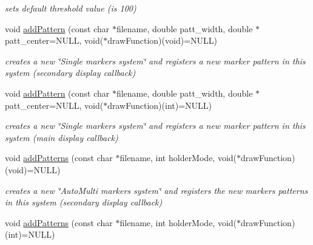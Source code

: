 \begin{DoxyCompactItemize}
\begin{DoxyCompactList}\small\item\em sets default threshold value (is 100) \end{DoxyCompactList}\item 
\hypertarget{classavr_application_a0b3fcb128e6ce2903905f9d595c32990}{void \hyperlink{classavr_application_a0b3fcb128e6ce2903905f9d595c32990}{add\-Pattern} (const char $\ast$filename, double patt\-\_\-width, double $\ast$patt\-\_\-center=N\-U\-L\-L, void($\ast$draw\-Function)(void)=N\-U\-L\-L)}\label{classavr_application_a0b3fcb128e6ce2903905f9d595c32990}

\begin{DoxyCompactList}\small\item\em creates a new \char`\"{}\-Single markers system\char`\"{} and registers a new marker pattern in this system (secondary display callback) \end{DoxyCompactList}\item 
\hypertarget{classavr_application_abbb6e9ba0158310dc26916a5838e91f8}{void \hyperlink{classavr_application_abbb6e9ba0158310dc26916a5838e91f8}{add\-Pattern} (const char $\ast$filename, double patt\-\_\-width, double $\ast$patt\-\_\-center=N\-U\-L\-L, void($\ast$draw\-Function)(int)=N\-U\-L\-L)}\label{classavr_application_abbb6e9ba0158310dc26916a5838e91f8}

\begin{DoxyCompactList}\small\item\em creates a new \char`\"{}\-Single markers system\char`\"{} and registers a new marker pattern in this system (main display callback) \end{DoxyCompactList}\item 
\hypertarget{classavr_application_a43b5fec0a9d6f3aca838d65101d3fe70}{void \hyperlink{classavr_application_a43b5fec0a9d6f3aca838d65101d3fe70}{add\-Patterns} (const char $\ast$filename, int holder\-Mode, void($\ast$draw\-Function)(void)=N\-U\-L\-L)}\label{classavr_application_a43b5fec0a9d6f3aca838d65101d3fe70}

\begin{DoxyCompactList}\small\item\em creates a new \char`\"{}\-Auto\-Multi markers system\char`\"{} and registers the new markers patterns in this system (secondary display callback) \end{DoxyCompactList}\item 
\hypertarget{classavr_application_a079003c61990d363c64dd2b9eab10739}{void \hyperlink{classavr_application_a079003c61990d363c64dd2b9eab10739}{add\-Patterns} (const char $\ast$filename, int holder\-Mode, void($\ast$draw\-Function)(int)=N\-U\-L\-L)}\label{classavr_application_a079003c61990d363c64dd2b9eab10739}


\end{DoxyCompactItemize}

